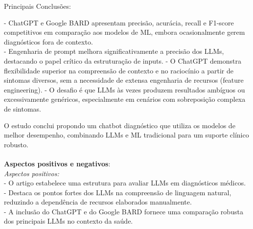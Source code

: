 \documentclass[
	article,
	11pt,
	oneside,
	a4paper,
	english,
	brazil,
	sumario=tradicional
	]{abntex2}
\begin{document}
\begin{enumerate}
Principais Conclusões:

- ChatGPT e Google BARD apresentam precisão, acurácia, recall e F1-score competitivos em comparação aos modelos de ML, embora ocasionalmente gerem diagnósticos fora de contexto.\\
- Engenharia de prompt melhora significativamente a precisão dos LLMs, destacando o papel crítico da estruturação de inputs.
- O ChatGPT demonstra flexibilidade superior na compreensão de contexto e no raciocínio a partir de sintomas diversos, sem a necessidade de extensa engenharia de recursos (feature engineering).
- O desafio é que LLMs às vezes produzem resultados ambíguos ou excessivamente genéricos, especialmente em cenários com sobreposição complexa de sintomas.

O estudo conclui propondo um chatbot diagnóstico que utiliza os modelos de melhor desempenho, combinando LLMs e ML tradicional para um suporte clínico robusto.
\\ \\
\textbf{Aspectos positivos e negativos}:\\
\textit{Aspectos positivos:} \\
- O artigo estabelece uma estrutura para avaliar LLMs em diagnósticos médicos.\\
- Destaca os pontos fortes dos LLMs na compreensão de linguagem natural, reduzindo a dependência de recursos elaborados manualmente.\\
- A inclusão do ChatGPT e do Google BARD fornece uma comparação robusta dos principais LLMs no contexto da saúde.


\end{enumerate}
\end{document}
